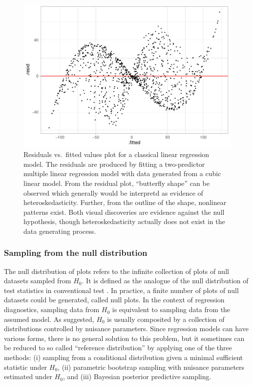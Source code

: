 \documentclass[]{interact}
\theoremstyle{plain}%
\theoremstyle{definition}
\theoremstyle{remark}
\begin{document}
\begin{figure}
\centering
\includegraphics{paper_comparison_files/figure-latex/residual-plot-cubic-heter-1.pdf}
\caption{Residuals vs.~fitted values plot for a classical linear
regression model. The residuals are produced by fitting a two-predictor
multiple linear regression model with data generated from a cubic linear
model. From the residual plot, ``butterfly shape'' can be observed which
generally would be interpretd as evidence of heteroskedasticity.
Further, from the outline of the shape, nonlinear patterns exist. Both
visual discoveries are evidence against the null hypothesis, though
heteroskedasticity actually does not exist in the data generating
process. \label{fig:residual-plot-cubic-heter}}
\end{figure}

\hypertarget{se:sampling-from-null}{%
\subsubsection{Sampling from the null
distribution}\label{se:sampling-from-null}}

The null distribution of plots refers to the infinite collection of
plots of null datasets sampled from \(H_0\). It is defined as the
analogue of the null distribution of test statistics in conventional
test \citep{buja_statistical_2009}. In practice, a finite number of
plots of null datasets could be generated, called null plots. In the
context of regression diagnostics, sampling data from \(H_0\) is
equivalent to sampling data from the assumed model. As
\citet{buja_statistical_2009} suggested, \(H_0\) is usually composited
by a collection of distributions controlled by nuisance parameters.
Since regression models can have various forms, there is no general
solution to this problem, but it sometimes can be reduced to so called
``reference distribution'' by applying one of the three methods: (i)
sampling from a conditional distribution given a minimal sufficient
statistic under \(H_0\), (ii) parametric bootstrap sampling with
nuisance parameters estimated under \(H_0\), and (iii) Bayesian
posterior predictive sampling.
\end{document}
